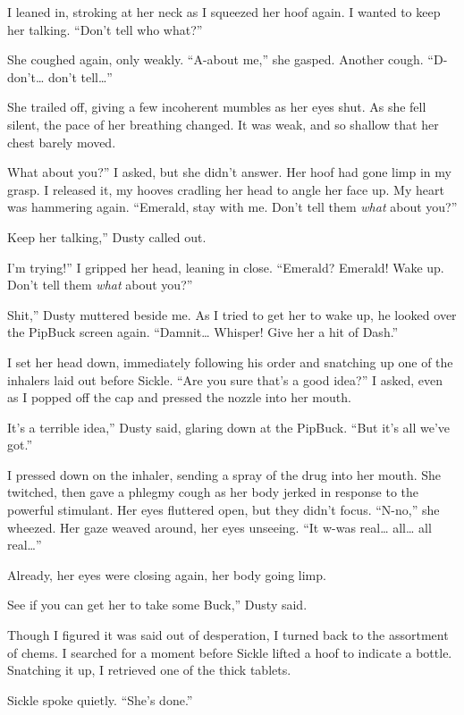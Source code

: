 I leaned in, stroking at her neck as I squeezed her hoof again. I wanted to keep her talking. “Don’t tell who what?”

She coughed again, only weakly. “A-about me,” she gasped. Another cough. “D-don’t… don’t tell…”

She trailed off, giving a few incoherent mumbles as her eyes shut. As she fell silent, the pace of her breathing changed. It was weak, and so shallow that her chest barely moved.

\leavevmode{}What about you?” I asked, but she didn’t answer. Her hoof had gone limp in my grasp. I released it, my hooves cradling her head to angle her face up. My heart was hammering again. “Emerald, stay with me. Don’t tell them \textit{what} about you?”

\leavevmode{}Keep her talking,” Dusty called out.

\leavevmode{}I’m trying!” I gripped her head, leaning in close. “Emerald? Emerald! Wake up. Don’t tell them \textit{what} about you?”

\leavevmode{}Shit,” Dusty muttered beside me. As I tried to get her to wake up, he looked over the PipBuck screen again. “Damnit… Whisper! Give her a hit of Dash.”

I set her head down, immediately following his order and snatching up one of the inhalers laid out before Sickle. “Are you sure that’s a good idea?” I asked, even as I popped off the cap and pressed the nozzle into her mouth.

\leavevmode{}It’s a terrible idea,” Dusty said, glaring down at the PipBuck. “But it’s all we’ve got.”

I pressed down on the inhaler, sending a spray of the drug into her mouth. She twitched, then gave a phlegmy cough as her body jerked in response to the powerful stimulant. Her eyes fluttered open, but they didn’t focus. “N-no,” she wheezed. Her gaze weaved around, her eyes unseeing. “It w-was real… all… all real…”

Already, her eyes were closing again, her body going limp.

\leavevmode{}See if you can get her to take some Buck,” Dusty said.

Though I figured it was said out of desperation, I turned back to the assortment of chems. I searched for a moment before Sickle lifted a hoof to indicate a bottle. Snatching it up, I retrieved one of the thick tablets.

Sickle spoke quietly. “She’s done.”

